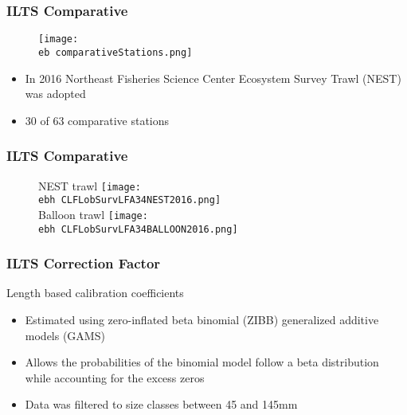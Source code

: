 \documentclass{beamer}
\newcommand{\eb}{\string~/bio.data/bio.lobster/figures/ILTS/} %
\newcommand{\ebh}{\string~/bio.data/bio.lobster/figures/LFA3438Framework2019/} %
\begin{document}
\begin{frame}
\frametitle{ILTS Comparative}
\begin{minipage}[c]{0.45\textwidth}
\begin{figure}
        \begin{center}
            \texttt{[image: \\eb comparativeStations.png]}
        \end{center}
    \end{figure}
\end{minipage}
\hfill
\begin{minipage}[c]{0.45\textwidth}
\begin{itemize}
    \item In 2016 Northeast Fisheries Science Center  Ecosystem Survey Trawl (NEST) was adopted
    \item 30 of 63 comparative stations  
\end{itemize}
\end{minipage}


\end{frame}


\begin{frame}
\frametitle{ILTS Comparative}
\begin{figure}
        \begin{center}
            NEST trawl
            \texttt{[image: \\ebh CLFLobSurvLFA34NEST2016.png]}\\
            Balloon trawl
            \texttt{[image: \\ebh CLFLobSurvLFA34BALLOON2016.png]}
        \end{center}
    \end{figure}
\end{frame}


\begin{frame}
\frametitle{ILTS Correction Factor}
Length based calibration coefficients
\begin{itemize}
\item Estimated using zero-inflated beta binomial (ZIBB) generalized additive models (GAMS) 
\item Allows the probabilities of the binomial model follow a beta distribution while accounting for the excess zeros
\item Data was filtered to size classes between 45 and 145mm 
\end{itemize}

\end{frame}
\end{document}
